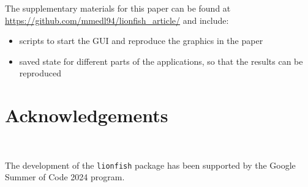 \documentclass[article]{ajs}
\begin{document}
The supplementary materials for this paper can be found at \href{https://github.com/mmedl94/lionfish_article/}{https://github.com/mmedl94/lionfish\_article/} and include:

\begin{itemize} \itemsep 0in
\item scripts to start the GUI and reproduce the graphics in the paper
\item saved state for different parts of the applications, so that the results can be reproduced
\end{itemize}

\section{Acknowledgements}~\label{acknowledgements}

The development of the \texttt{lionfish} package has been supported by the Google Summer of Code 2024 program.

%

\end{document}
